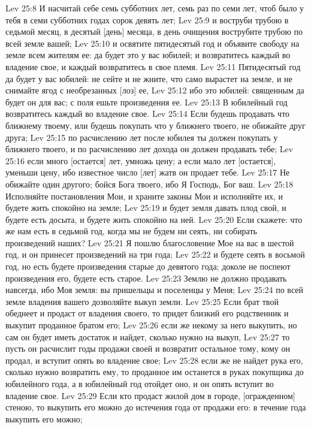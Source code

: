 Lev 25:8  И насчитай себе семь субботних лет, семь раз по семи лет, чтоб было у тебя в семи субботних годах сорок девять лет;
Lev 25:9  и воструби трубою в седьмой месяц, в десятый [день] месяца, в день очищения вострубите трубою по всей земле вашей;
Lev 25:10  и освятите пятидесятый год и объявите свободу на земле всем жителям ее: да будет это у вас юбилей; и возвратитесь каждый во владение свое, и каждый возвратитесь в свое племя.
Lev 25:11  Пятидесятый год да будет у вас юбилей: не сейте и не жните, что само вырастет на земле, и не снимайте ягод с необрезанных [лоз] ее,
Lev 25:12  ибо это юбилей: священным да будет он для вас; с поля ешьте произведения ее.
Lev 25:13  В юбилейный год возвратитесь каждый во владение свое.
Lev 25:14  Если будешь продавать что ближнему твоему, или будешь покупать что у ближнего твоего, не обижайте друг друга;
Lev 25:15  по расчислению лет после юбилея ты должен покупать у ближнего твоего, и по расчислению лет дохода он должен продавать тебе;
Lev 25:16  если много [остается] лет, умножь цену; а если мало лет [остается], уменьши цену, ибо известное число [лет] жатв он продает тебе.
Lev 25:17  Не обижайте один другого; бойся Бога твоего, ибо Я Господь, Бог ваш.
Lev 25:18  Исполняйте постановления Мои, и храните законы Мои и исполняйте их, и будете жить спокойно на земле;
Lev 25:19  и будет земля давать плод свой, и будете есть досыта, и будете жить спокойно на ней.
Lev 25:20  Если скажете: что же нам есть в седьмой год, когда мы не будем ни сеять, ни собирать произведений наших?
Lev 25:21  Я пошлю благословение Мое на вас в шестой год, и он принесет произведений на три года;
Lev 25:22  и будете сеять в восьмой год, но есть будете произведения старые до девятого года; доколе не поспеют произведения его, будете есть старое.
Lev 25:23  Землю не должно продавать навсегда, ибо Моя земля: вы пришельцы и поселенцы у Меня;
Lev 25:24  по всей земле владения вашего дозволяйте выкуп земли.
Lev 25:25  Если брат твой обеднеет и продаст от владения своего, то придет близкий его родственник и выкупит проданное братом его;
Lev 25:26  если же некому за него выкупить, но сам он будет иметь достаток и найдет, сколько нужно на выкуп,
Lev 25:27  то пусть он расчислит годы продажи своей и возвратит остальное тому, кому он продал, и вступит опять во владение свое;
Lev 25:28  если же не найдет рука его, сколько нужно возвратить ему, то проданное им останется в руках покупщика до юбилейного года, а в юбилейный год отойдет оно, и он опять вступит во владение свое.
Lev 25:29  Если кто продаст жилой дом в городе, [огражденном] стеною, то выкупить его можно до истечения года от продажи его: в течение года выкупить его можно;
